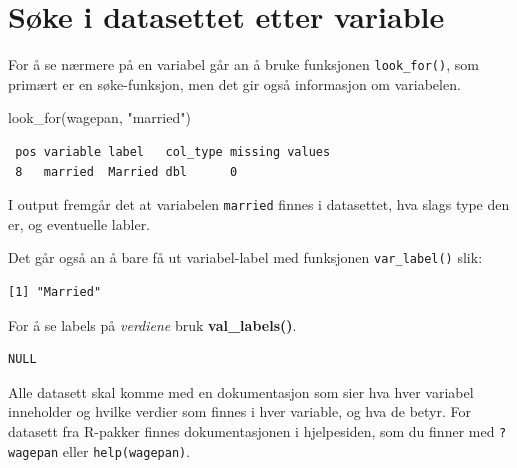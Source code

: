 \documentclass[
  norsk,
  letterpaper,
  DIV=11,
  numbers=noendperiod]{scrreprt}
\newenvironment{Shaded}{\begin{snugshade}}{\end{snugshade}}
\newcommand{\FunctionTok}[1]{\textcolor[rgb]{0.28,0.35,0.67}{#1}}
\newcommand{\NormalTok}[1]{\textcolor[rgb]{0.00,0.23,0.31}{#1}}
\newcommand{\SpecialCharTok}[1]{\textcolor[rgb]{0.37,0.37,0.37}{#1}}
\newcommand{\StringTok}[1]{\textcolor[rgb]{0.13,0.47,0.30}{#1}}
\theoremstyle{definition}
\theoremstyle{remark}
\begin{document}
\section{Søke i datasettet etter
variable}\label{suxf8ke-i-datasettet-etter-variable}

For å se nærmere på en variabel går an å bruke funksjonen
\texttt{look\_for()}, som primært er en søke-funksjon, men det gir også
informasjon om variabelen.

\begin{Shaded}
\begin{Highlighting}[]
\FunctionTok{look\_for}\NormalTok{(wagepan, }\StringTok{"married"}\NormalTok{)}
\end{Highlighting}
\end{Shaded}

\begin{verbatim}
 pos variable label   col_type missing values
 8   married  Married dbl      0             
\end{verbatim}

I output fremgår det at variabelen \texttt{married} finnes i datasettet,
hva slags type den er, og eventuelle labler.

Det går også an å bare få ut variabel-label med funksjonen
\texttt{var\_label()} slik:

\begin{Shaded}
\end{Shaded}

\begin{verbatim}
[1] "Married"
\end{verbatim}

For å se labels på \emph{verdiene} bruk \textbf{val\_labels()}.

\begin{Shaded}
\end{Shaded}

\begin{verbatim}
NULL
\end{verbatim}

Alle datasett skal komme med en dokumentasjon som sier hva hver variabel
inneholder og hvilke verdier som finnes i hver variable, og hva de
betyr. For datasett fra R-pakker finnes dokumentasjonen i hjelpesiden,
som du finner med \texttt{?wagepan} eller \texttt{help(wagepan)}.
\end{document}
